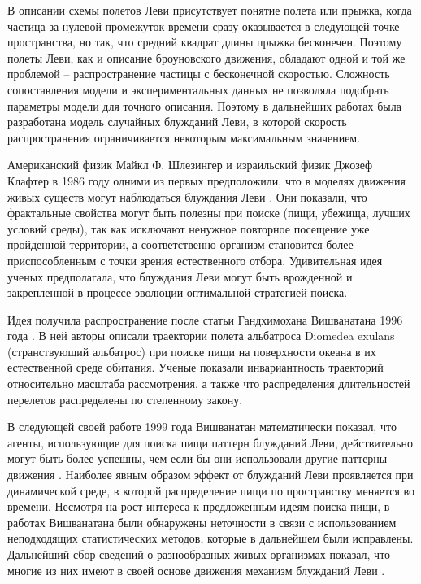 В описании схемы полетов Леви присутствует понятие полета или прыжка, когда частица за нулевой промежуток времени сразу оказывается в следующей точке пространства, но так, что средний квадрат длины прыжка бесконечен. Поэтому полеты Леви, как и описание броуновского движения, обладают одной и той же проблемой -- распространение частицы с бесконечной скоростью. Сложность сопоставления модели и экспериментальных данных не позволяла подобрать параметры модели для точного описания. Поэтому в дальнейших работах была разработана модель случайных блужданий Леви, в которой скорость распространения ограничивается некоторым максимальным значением. 

Американский физик Майкл Ф. Шлезингер и израильский физик Джозеф Клафтер в 1986 году одними из первых предположили, что в моделях движения живых существ могут наблюдаться блуждания Леви \cite{shlesinger_levy_1986}. Они показали, что фрактальные свойства могут быть полезны при поиске (пищи, убежища, лучших условий среды), так как исключают ненужное повторное посещение уже пройденной территории, а соответственно организм становится более приспособленным с точки зрения естественного отбора. Удивительная идея ученых предполагала, что блуждания Леви могут быть врожденной и закрепленной в процессе эволюции оптимальной стратегией поиска.

Идея получила распространение после статьи Гандхимохана Вишванатана 1996 года \cite{viswanathan_levy_1996}. В ней авторы описали траектории полета альбатроса Diomedea exulans (странствующий альбатрос) при поиске пищи на поверхности океана в их естественной среде обитания. Ученые показали инвариантность траекторий относительно масштаба рассмотрения, а также что распределения длительностей перелетов распределены по степенному закону. 

В следующей своей работе 1999 года Вишванатан математически показал, что агенты, использующие для поиска пищи паттерн блужданий Леви, действительно могут быть более успешны, чем если бы они использовали другие паттерны движения \cite{viswanathan_optimizing_1999}. Наиболее явным образом эффект от блужданий Леви проявляется при динамической среде, в которой распределение пищи по пространству меняется во времени. Несмотря на рост интереса к предложенным идеям поиска пищи, в работах Вишванатана были обнаружены неточности в связи с использованием неподходящих статистических методов, которые в дальнейшем были исправлены. Дальнейший сбор сведений о разнообразных живых организмах показал, что многие из них имеют в своей основе движения механизм блужданий Леви \cite{zaburdaev_levy_2015}.

